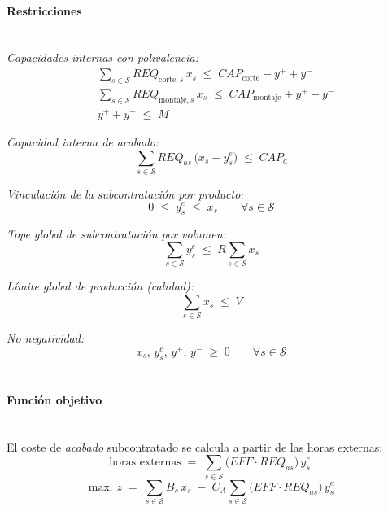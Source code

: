 \paragraph{Restricciones}\mbox{}\\
\emph{Capacidades internas con polivalencia:}
\begin{align}
    & \sum_{s \in \mathcal{S}} REQ_{\text{corte},s}\, x_s \;\le\; CAP_{\text{corte}} - y^+ + y^- \\
    & \sum_{s \in \mathcal{S}} REQ_{\text{montaje},s}\, x_s \;\le\; CAP_{\text{montaje}} + y^+ - y^- \\
    & y^+ + y^- \;\le\; M
\end{align}

\emph{Capacidad interna de \textit{acabado}:}
\begin{equation}
    \sum_{s \in \mathcal{S}} REQ_{a s}\,\big(x_s - y_s^{e}\big) \;\le\; CAP_a
\end{equation}

\emph{Vinculación de la subcontratación por producto:}
\begin{equation}
    0 \;\le\; y_s^{e} \;\le\; x_s \qquad \forall s \in \mathcal{S}
\end{equation}

\emph{Tope global de subcontratación por volumen:}
\begin{equation}
    \sum_{s \in \mathcal{S}} y_s^{e} \;\le\; R \sum_{s \in \mathcal{S}} x_s
\end{equation}

\emph{Límite global de producción (calidad):}
\begin{equation}
    \sum_{s \in \mathcal{S}} x_s \;\le\; V
\end{equation}

\emph{No negatividad:}
\begin{equation}
    x_s,\, y_s^{e},\, y^+,\, y^- \;\ge\; 0 \qquad \forall s \in \mathcal{S}
\end{equation}
\\

\paragraph{Función objetivo}\mbox{}\\
El coste de \textit{acabado} subcontratado se calcula a partir de las horas externas:
\[
\text{horas externas} \;=\; \sum_{s \in \mathcal{S}} \big(EFF \cdot REQ_{a s}\big)\, y_s^{e}.
\]
\begin{equation}
\mbox{max. } z \;=\; \sum_{s \in \mathcal{S}} B_s\, x_s \;-\; C_A \sum_{s \in \mathcal{S}} \big(EFF \cdot REQ_{a s}\big)\, y_s^{e}
\end{equation}

